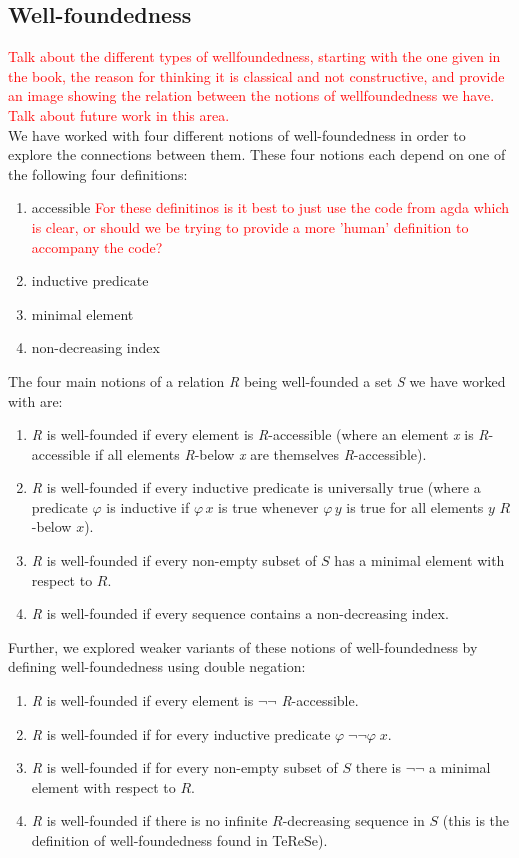 \documentclass{scrartcl}
\begin{document}
\subsection{Well-foundedness}
\textcolor{red}{Talk about the different types of wellfoundedness, starting with the one given in the book, the reason for thinking it is classical and not constructive, and provide an image showing the relation between the notions of wellfoundedness we have. Talk about future work in this area.}
\\
We have worked with four different notions of well-foundedness in order to explore the connections between them. These four notions each depend on one of the following four definitions:
\begin{enumerate}
    \item accessible \textcolor{red}{For these definitinos is it best to just use the code from agda which is clear, or should we be trying to provide a more 'human' definition to accompany the code?}
    \item inductive predicate
    \item minimal element
    \item non-decreasing index
\end{enumerate}
The four main notions of a relation \textit{R} being well-founded a set \textit{S} we have worked with are:
\begin{enumerate}
    \item \textit{R} is well-founded if every element is \textit{R}-accessible (where an element \textit{x} is \textit{R}-accessible if all elements \textit{R}-below \textit{x}  are themselves \textit{R}-accessible).
    \item \textit{R} is well-founded if every inductive predicate is universally true (where a predicate $\varphi$ is inductive if $\varphi\,x$ is true whenever $\varphi\,y$ is true for all elements $y$ $R$-below $x$).
    \item \textit{R} is well-founded if every non-empty subset of $S$ has a minimal element with respect to $R$.
    \item \textit{R} is well-founded if every sequence contains a non-decreasing index.
\end{enumerate}
Further, we explored weaker variants of these notions of well-foundedness by defining well-foundedness using double negation:
\begin{enumerate}
    \item \textit{R} is well-founded if every element is $\lnot \lnot$  \textit{R}-accessible.
    \item \textit{R} is well-founded if for every inductive predicate $\varphi \; \lnot \lnot \varphi \; x$.
    \item \textit{R} is well-founded if for every non-empty subset of $S$ there is $\lnot \lnot$ a minimal element with respect to $R$.
    \item \textit{R} is well-founded if there is no infinite $R$-decreasing sequence in $S$ (this is the definition of well-foundedness found in TeReSe).
\end{enumerate}
\end{document}

